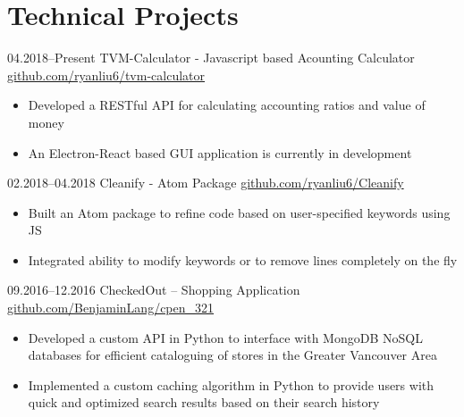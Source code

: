\documentclass[]{cv-style}          %
\begin{document}

\section{Technical Projects}

\begin{entrylist}
\entry
  {04.2018--Present}
  {TVM-Calculator - Javascript based Acounting Calculator}
  {\href{https://github.com/ryanliu6/tvm-calculator}{github.com/ryanliu6/tvm-calculator}}
  {
  \begin{itemize}[leftmargin=*]
    \item Developed a RESTful API for calculating accounting ratios and value of money
    \item An Electron-React based GUI application is currently in development
  \end{itemize}}
\entry
  {02.2018--04.2018}
  {Cleanify - Atom Package}
  {\href{https://github.com/ryanliu6/Cleanify}{github.com/ryanliu6/Cleanify}}
  {
  \begin{itemize}[leftmargin=*]
    \item Built an Atom package to refine code based on user-specified keywords using JS
    \item Integrated ability to modify keywords or to remove lines completely on the fly
  \end{itemize}}
\entry
  {09.2016--12.2016}
  {CheckedOut – Shopping Application}
  {\href{https://github.com/BenjaminLang/cpen_321}{github.com/BenjaminLang/cpen\_321}}
  {
  \begin{itemize}[leftmargin=*]
    \item Developed a custom API in Python to interface with MongoDB NoSQL databases for efficient cataloguing of stores in the Greater Vancouver Area
    \item Implemented a custom caching algorithm in Python to provide users with quick and optimized search results based on their search history
  \end{itemize}}

\end{entrylist}
\end{document}
